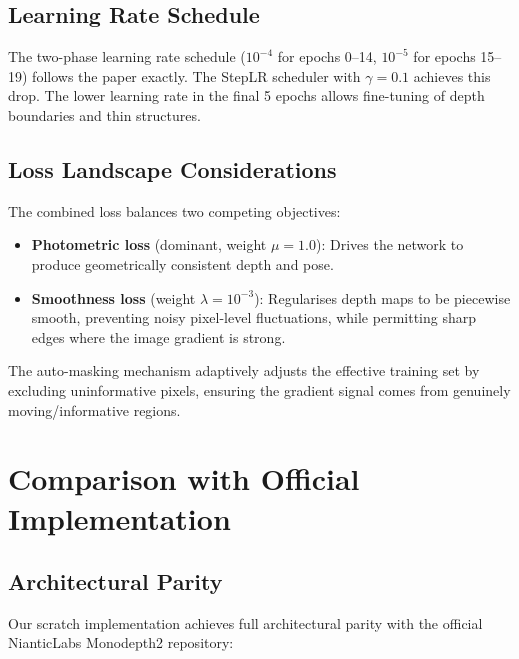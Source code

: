 \documentclass[10pt, a4paper, twocolumn]{article}
\begin{document}
\subsection{Learning Rate Schedule}

The two-phase learning rate schedule ($10^{-4}$ for epochs 0--14, $10^{-5}$ for epochs 15--19) follows the paper exactly. The StepLR scheduler with $\gamma = 0.1$ achieves this drop. The lower learning rate in the final 5 epochs allows fine-tuning of depth boundaries and thin structures.

\subsection{Loss Landscape Considerations}

The combined loss balances two competing objectives:
\begin{itemize}[noitemsep]
    \item \textbf{Photometric loss} (dominant, weight $\mu = 1.0$): Drives the network to produce geometrically consistent depth and pose.
    \item \textbf{Smoothness loss} (weight $\lambda = 10^{-3}$): Regularises depth maps to be piecewise smooth, preventing noisy pixel-level fluctuations, while permitting sharp edges where the image gradient is strong.
\end{itemize}

The auto-masking mechanism adaptively adjusts the effective training set by excluding uninformative pixels, ensuring the gradient signal comes from genuinely moving/informative regions.

\section{Comparison with Official Implementation}
\label{sec:comparison}

\subsection{Architectural Parity}

Our scratch implementation achieves full architectural parity with the official NianticLabs Monodepth2 repository:
\end{document}
